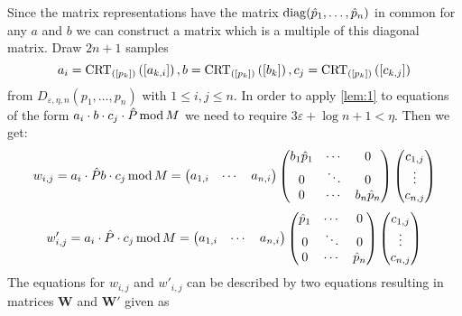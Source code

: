 \documentclass[english]{scrartcl}
\theoremstyle{plain}
\theoremstyle{definition}
\begin{document}
    Since the matrix representations have the matrix $\operatorname{diag}(\hat{p}_1, \dots, \hat{p}_n)$ in common for any $a$ and $b$ we can construct a matrix which is a multiple of this diagonal matrix.
    Draw $2n+1$ samples
    \begin{equation*}
        a_i = \operatorname{CRT}_{([p_{k}])}\left(\left[a_{k, i}\right]\right), b = \operatorname{CRT}_{([p_{k}])}\left(\left[b_k\right]\right), c_j = \operatorname{CRT}_{([p_{k}])}\left(\left[c_{k, j}\right]\right)
    \end{equation*}
    from $D_{\varepsilon, \eta, n}(p_1, \dots, p_n)$ with $1 \leq i,j \leq n$. In order to apply \cref{lem:1} to equations of the form $a_i \cdot b \cdot c_j \cdot \hat{P} \operatorname{mod} M$ we need to require $3\varepsilon + \log n + 1 < \eta$. Then we get:
    \begin{equation*}
        w_{i,j} = a_i \cdot \hat{P} b \cdot c_j \operatorname{mod} M =
        \begin{pmatrix}
            a_{1, i} & \cdots & a_{n, i}
        \end{pmatrix}
        \begin{pmatrix}
            b_1 \hat{p}_1 & \cdots & 0 \\
            0 & \ddots & 0 \\
            0 & \cdots & b_n \hat{p}_n
        \end{pmatrix}
        \begin{pmatrix}
            c_{1, j} \\
            \vdots \\
            c_{n, j}
        \end{pmatrix}
    \end{equation*}
    \begin{equation*}
        w'_{i,j} = a_i \cdot \hat{P} \cdot c_j \operatorname{mod} M =
        \begin{pmatrix}
            a_{1, i} & \cdots & a_{n, i}
        \end{pmatrix}
        \begin{pmatrix}
            \hat{p}_1 & \cdots & 0 \\
            0 & \ddots & 0 \\
            0 & \cdots & \hat{p}_n
        \end{pmatrix}
        \begin{pmatrix}
            c_{1, j} \\
            \vdots \\
            c_{n, j}
        \end{pmatrix}
    \end{equation*}
    The equations for $w_{i,j}$ and $w'_{i,j}$ can be described by two equations resulting in matrices $\mathbf{W}$ and $\mathbf{W'}$ given as
\end{document}

